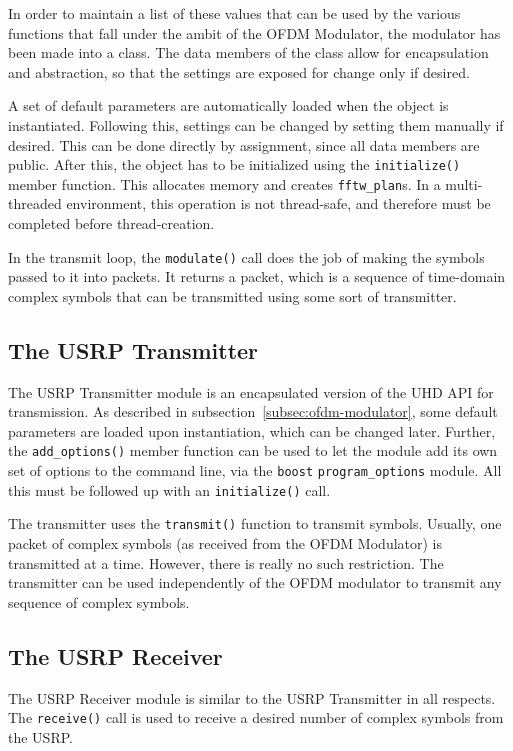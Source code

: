 In order to maintain a list of these values that can be used by the various
functions that fall under the ambit of the OFDM Modulator, the modulator has
been made into a class. The data members of the class allow for encapsulation
and abstraction, so that the settings are exposed for change only if desired.

A set of default parameters are automatically loaded when the object is
instantiated. Following this, settings can be changed by setting them manually
if desired. This can be done directly by assignment, since all data members are
public. After this, the object has to be initialized using the
\lstinline!initialize()! member function. This allocates memory and creates
\lstinline!fftw_plan!s. In a multi-threaded environment, this operation is not
thread-safe, and therefore must be completed before thread-creation.

In the transmit loop, the \lstinline!modulate()! call does the job of making
the symbols passed to it into packets. It returns a packet, which is a sequence
of time-domain complex symbols that can be transmitted using some sort of
transmitter.

\subsection{The USRP Transmitter}

The USRP Transmitter module is an encapsulated version of the UHD API for
transmission. As described in subsection~\ref{subsec:ofdm-modulator}, some
default parameters are loaded upon instantiation, which can be changed later.
Further, the \lstinline!add_options()! member function can be used to let the
module add its own set of options to the command line, via the
\lstinline!boost! \lstinline!program_options! module. All this must be
followed up with an \lstinline!initialize()! call.

The transmitter uses the \lstinline!transmit()! function to transmit symbols.
Usually, one packet of complex symbols (as received from the OFDM Modulator) is
transmitted at a time. However, there is really no such restriction. The
transmitter can be used independently of the OFDM modulator to transmit any
sequence of complex symbols.

\subsection{The USRP Receiver}

The USRP Receiver module is similar to the USRP Transmitter in all respects.
The \lstinline!receive()! call is used to receive a desired number of complex
symbols from the USRP.

